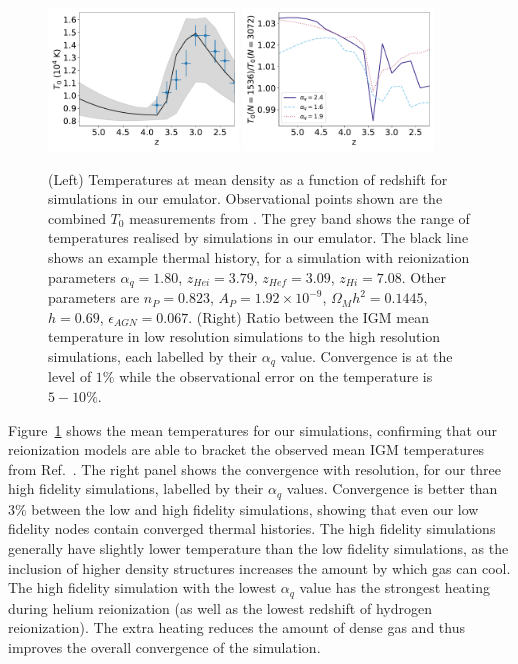 \documentclass[a4paper,11pt]{article}
\begin{document}
\begin{figure}
\includegraphics[width=0.45\textwidth]{figures/mean-temperature.pdf}
\includegraphics[width=0.45\textwidth]{figures/mean-temperature-resolution.pdf}
 \caption{(Left) Temperatures at mean density as a function of redshift for simulations in our emulator. Observational points shown are the combined $T_0$ measurements from \protect\cite{Gaikwad:2021}.  The grey band shows the range of temperatures realised by simulations in our emulator. The black line shows an example thermal history, for a simulation with reionization parameters $\alpha_q = 1.80$, $z_{Hei} = 3.79$, $z_{Hef} = 3.09$, $z_{Hi} = 7.08$. Other parameters are $n_P = 0.823$, $A_P = 1.92 \times 10^{-9}$, $\Omega_M h^2 = 0.1445$, $h = 0.69$, $\epsilon_{AGN} = 0.067$.
 (Right) Ratio between the IGM mean temperature in low resolution simulations to the high resolution simulations, each labelled by their $\alpha_q$ value. Convergence is at the level of $1\%$ while the observational error on the temperature is $5-10\%$.
}
 \label{fig:meanigmtempdens}
\end{figure}

Figure~\ref{fig:meanigmtempdens} shows the mean temperatures for our simulations, confirming that our reionization models are able to bracket the observed mean IGM temperatures from Ref.~\cite{Gaikwad:2021}.
The right panel shows the convergence with resolution, for our three high fidelity simulations, labelled by their $\alpha_q$ values. Convergence is better than $3\%$ between the low and high fidelity simulations, showing that even our low fidelity nodes contain converged thermal histories.
The high fidelity simulations generally have slightly lower temperature than the low fidelity simulations, as the inclusion of higher density structures increases the amount by which gas can cool. The high fidelity simulation with the lowest $\alpha_q$ value has the strongest heating during helium reionization (as well as the lowest redshift of hydrogen reionization). The extra heating reduces the amount of dense gas and thus improves the overall convergence of the simulation.
\end{document}
